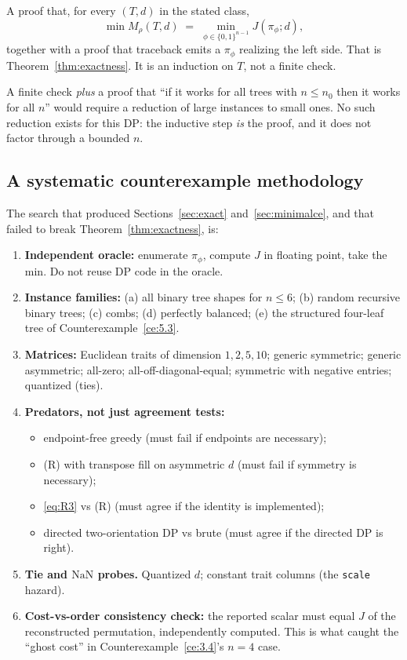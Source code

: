 \documentclass[11pt]{article}
\theoremstyle{plain}
\begin{document}
A proof that, for every \((T,d)\) in the stated class,
\[
\min M_\rho(T,d)
\;=\;
\min_{\phi \in \{0,1\}^{n-1}} J(\pi_\phi; d),
\]
together with a proof that traceback emits a \(\pi_\phi\) realizing the left
side. That is Theorem~\ref{thm:exactness}. It is an induction on \(T\), not a
finite check.

A finite check \emph{plus} a proof that ``if it works for all trees with
\(n \le n_0\) then it works for all \(n\)'' would require a reduction of large
instances to small ones. No such reduction exists for this DP: the inductive
step \emph{is} the proof, and it does not factor through a bounded \(n\).

\subsection{A systematic counterexample methodology}

The search that produced Sections~\ref{sec:exact} and~\ref{sec:minimalce}, and
that failed to break Theorem~\ref{thm:exactness}, is:

\begin{enumerate}[label=\arabic*.]
\item \textbf{Independent oracle:} enumerate \(\pi_\phi\), compute \(J\) in
  floating point, take the min. Do not reuse DP code in the oracle.
\item \textbf{Instance families:} (a) all binary tree shapes for \(n \le 6\);
  (b) random recursive binary trees; (c) combs; (d) perfectly balanced; (e) the
  structured four-leaf tree of Counterexample~\ref{ce:5.3}.
\item \textbf{Matrices:} Euclidean traits of dimension \(1,2,5,10\); generic
  symmetric; generic asymmetric; all-zero; all-off-diagonal-equal; symmetric
  with negative entries; quantized (ties).
\item \textbf{Predators, not just agreement tests:}
  \begin{itemize}
  \item endpoint-free greedy (must fail if endpoints are necessary);
  \item (R) with transpose fill on asymmetric \(d\) (must fail if symmetry is
    necessary);
  \item \eqref{eq:R3} vs (R) (must agree if the identity is implemented);
  \item directed two-orientation DP vs brute (must agree if the directed DP is
    right).
  \end{itemize}
\item \textbf{Tie and \(\mathrm{NaN}\) probes.} Quantized \(d\); constant trait
  columns (the \texttt{scale} hazard).
\item \textbf{Cost-vs-order consistency check:} the reported scalar must equal
  \(J\) of the reconstructed permutation, independently computed. This is what
  caught the ``ghost cost'' in Counterexample~\ref{ce:3.4}'s \(n=4\) case.
\end{enumerate}
\end{document}

